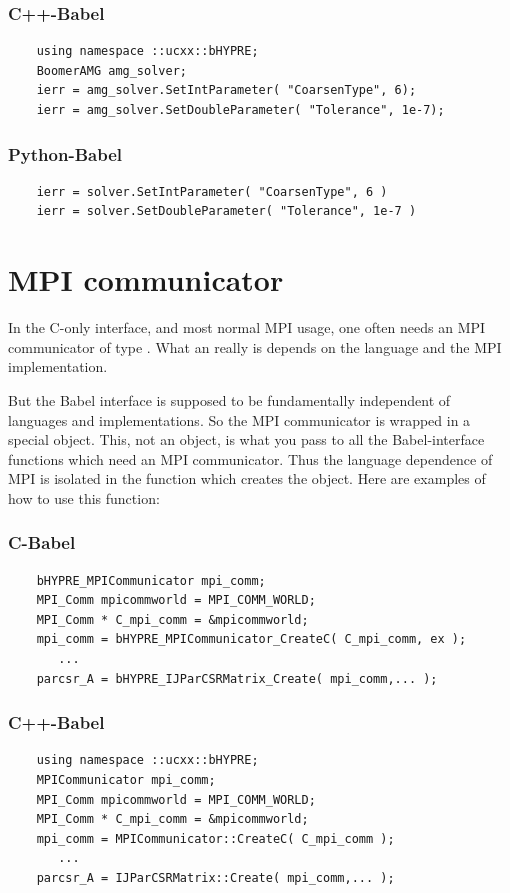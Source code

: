 \subsubsection{C++-Babel}
\begin{verbatim}
    using namespace ::ucxx::bHYPRE;
    BoomerAMG amg_solver;
    ierr = amg_solver.SetIntParameter( "CoarsenType", 6);
    ierr = amg_solver.SetDoubleParameter( "Tolerance", 1e-7);
\end{verbatim}

\subsubsection{Python-Babel}
\begin{verbatim}
    ierr = solver.SetIntParameter( "CoarsenType", 6 )
    ierr = solver.SetDoubleParameter( "Tolerance", 1e-7 )
\end{verbatim}


\section{MPI communicator}
\label{sec-MPI}

In the C-only \hypre{} interface, and most normal MPI usage, one often
needs an MPI communicator of type .  What an
 really is depends on the language and the MPI
implementation.

But the Babel interface is supposed to be fundamentally independent of
languages and implementations.  So the MPI communicator is wrapped in
a special  object.  This, not an
 object, is what you pass to all the Babel-interface
functions which need an MPI communicator.  Thus the language
dependence of MPI is isolated in the function which creates the
 object.  Here are examples of how to use
this function:

\subsubsection{C-Babel}
\begin{verbatim}
    bHYPRE_MPICommunicator mpi_comm;
    MPI_Comm mpicommworld = MPI_COMM_WORLD;
    MPI_Comm * C_mpi_comm = &mpicommworld;
    mpi_comm = bHYPRE_MPICommunicator_CreateC( C_mpi_comm, ex );
       ...
    parcsr_A = bHYPRE_IJParCSRMatrix_Create( mpi_comm,... );
\end{verbatim}

\subsubsection{C++-Babel}
\begin{verbatim}
    using namespace ::ucxx::bHYPRE;
    MPICommunicator mpi_comm;
    MPI_Comm mpicommworld = MPI_COMM_WORLD;
    MPI_Comm * C_mpi_comm = &mpicommworld;
    mpi_comm = MPICommunicator::CreateC( C_mpi_comm );
       ...
    parcsr_A = IJParCSRMatrix::Create( mpi_comm,... );
\end{verbatim}

